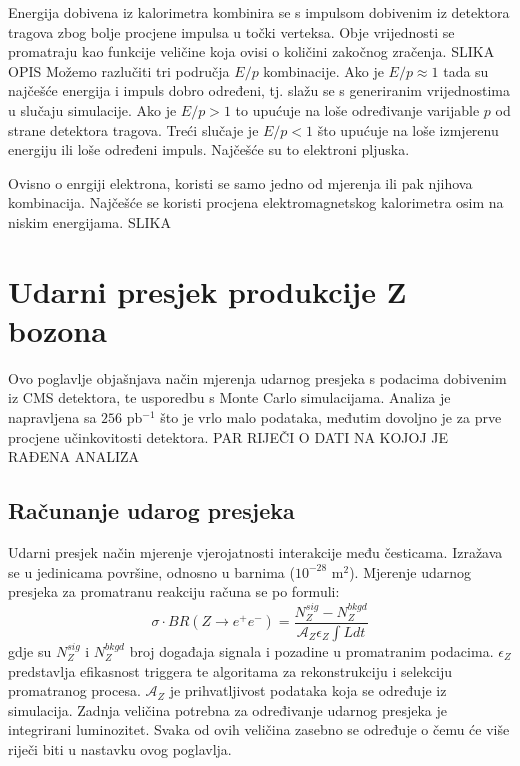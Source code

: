 \documentclass[a4paper,12pt]{report}
\begin{document}
Energija dobivena iz kalorimetra kombinira se s impulsom dobivenim iz detektora tragova zbog bolje procjene impulsa u točki verteksa. Obje vrijednosti se promatraju kao funkcije veličine koja ovisi o količini zakočnog zračenja. 
SLIKA OPIS
Možemo razlučiti tri područja $E/p$ kombinacije. Ako je $E/p\approx1$ tada su najčešće energija i impuls  dobro određeni, tj. slažu se s generiranim vrijednostima u slučaju simulacije. Ako je $E/p>1$ to upućuje na loše određivanje varijable $p$ od strane detektora tragova. Treći slučaje je $E/p<1$ što upućuje na loše izmjerenu energiju ili loše određeni impuls. Najčešće su to elektroni pljuska.

Ovisno o enrgiji elektrona, koristi se samo jedno od mjerenja ili pak njihova kombinacija. Najčešće se koristi procjena elektromagnetskog kalorimetra osim na niskim energijama.
SLIKA

 




\chapter{Udarni presjek produkcije Z bozona}
\label{ch:results}
Ovo poglavlje objašnjava način mjerenja udarnog presjeka s podacima dobivenim iz CMS detektora, te usporedbu s Monte Carlo simulacijama. Analiza je napravljena sa $256$ pb$^{-1}$ što je vrlo malo podataka, međutim dovoljno je za prve procjene učinkovitosti detektora. 
PAR RIJEČI O DATI NA KOJOJ JE RAĐENA ANALIZA

\section{Računanje udarog presjeka}
Udarni presjek način mjerenje vjerojatnosti interakcije među česticama. Izražava se u jedinicama površine, odnosno u barnima ($10^{-28}$ m$^2$). 
Mjerenje udarnog presjeka za promatranu reakciju računa se po formuli:
\begin{equation}
 \sigma \cdot BR(Z \rightarrow e^+ e^-)=\frac{N^{sig}_Z-N^{bkgd}_Z}{\mathcal{A}_Z \epsilon_Z \int L dt}
 \label{udarnipres}
\end{equation}
gdje su $N^{sig}_Z$ i $N^{bkgd}_Z$ broj događaja signala i pozadine u promatranim podacima. $\epsilon_Z$ predstavlja efikasnost triggera te algoritama za rekonstrukciju i selekciju promatranog procesa. $\mathcal{A}_Z$ je prihvatljivost podataka koja se određuje iz simulacija. Zadnja veličina potrebna za određivanje udarnog presjeka je integrirani luminozitet. Svaka od ovih veličina zasebno se određuje o čemu će više riječi biti u nastavku ovog poglavlja.
\end{document}

